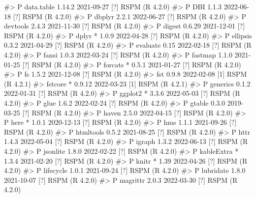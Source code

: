 \documentclass[
  11pt,
  letterpaper,
  DIV=11,
  numbers=noendperiod]{scrartcl}
\newenvironment{Shaded}{}{}
\newcommand{\CommentTok}[1]{\textcolor[rgb]{0.42,0.45,0.49}{#1}}
\begin{document}
\begin{Shaded}
\begin{Highlighting}[]
\CommentTok{\#\textgreater{}  P data.table    1.14.2  2021{-}09{-}27 [?] RSPM (R 4.2.0)}
\CommentTok{\#\textgreater{}  P DBI           1.1.3   2022{-}06{-}18 [?] RSPM (R 4.2.0)}
\CommentTok{\#\textgreater{}  P dbplyr        2.2.1   2022{-}06{-}27 [?] RSPM (R 4.2.0)}
\CommentTok{\#\textgreater{}  P devtools      2.4.3   2021{-}11{-}30 [?] RSPM (R 4.2.0)}
\CommentTok{\#\textgreater{}  P digest        0.6.29  2021{-}12{-}01 [?] RSPM (R 4.2.0)}
\CommentTok{\#\textgreater{}  P dplyr       * 1.0.9   2022{-}04{-}28 [?] RSPM (R 4.2.0)}
\CommentTok{\#\textgreater{}  P ellipsis      0.3.2   2021{-}04{-}29 [?] RSPM (R 4.2.0)}
\CommentTok{\#\textgreater{}  P evaluate      0.15    2022{-}02{-}18 [?] RSPM (R 4.2.0)}
\CommentTok{\#\textgreater{}  P fansi         1.0.3   2022{-}03{-}24 [?] RSPM (R 4.2.0)}
\CommentTok{\#\textgreater{}  P fastmap       1.1.0   2021{-}01{-}25 [?] RSPM (R 4.2.0)}
\CommentTok{\#\textgreater{}  P forcats     * 0.5.1   2021{-}01{-}27 [?] RSPM (R 4.2.0)}
\CommentTok{\#\textgreater{}  P fs            1.5.2   2021{-}12{-}08 [?] RSPM (R 4.2.0)}
\CommentTok{\#\textgreater{}    fst           0.9.8   2022{-}02{-}08 [1] RSPM (R 4.2.1)}
\CommentTok{\#\textgreater{}    fstcore     * 0.9.12  2022{-}03{-}23 [1] RSPM (R 4.2.1)}
\CommentTok{\#\textgreater{}  P generics      0.1.2   2022{-}01{-}31 [?] RSPM (R 4.2.0)}
\CommentTok{\#\textgreater{}  P ggplot2     * 3.3.6   2022{-}05{-}03 [?] RSPM (R 4.2.0)}
\CommentTok{\#\textgreater{}  P glue          1.6.2   2022{-}02{-}24 [?] RSPM (R 4.2.0)}
\CommentTok{\#\textgreater{}  P gtable        0.3.0   2019{-}03{-}25 [?] RSPM (R 4.2.0)}
\CommentTok{\#\textgreater{}  P haven         2.5.0   2022{-}04{-}15 [?] RSPM (R 4.2.0)}
\CommentTok{\#\textgreater{}  P here        * 1.0.1   2020{-}12{-}13 [?] RSPM (R 4.2.0)}
\CommentTok{\#\textgreater{}  P hms           1.1.1   2021{-}09{-}26 [?] RSPM (R 4.2.0)}
\CommentTok{\#\textgreater{}  P htmltools     0.5.2   2021{-}08{-}25 [?] RSPM (R 4.2.0)}
\CommentTok{\#\textgreater{}  P httr          1.4.3   2022{-}05{-}04 [?] RSPM (R 4.2.0)}
\CommentTok{\#\textgreater{}  P igraph        1.3.2   2022{-}06{-}13 [?] RSPM (R 4.2.0)}
\CommentTok{\#\textgreater{}  P jsonlite      1.8.0   2022{-}02{-}22 [?] RSPM (R 4.2.0)}
\CommentTok{\#\textgreater{}  P kableExtra  * 1.3.4   2021{-}02{-}20 [?] RSPM (R 4.2.0)}
\CommentTok{\#\textgreater{}  P knitr       * 1.39    2022{-}04{-}26 [?] RSPM (R 4.2.0)}
\CommentTok{\#\textgreater{}  P lifecycle     1.0.1   2021{-}09{-}24 [?] RSPM (R 4.2.0)}
\CommentTok{\#\textgreater{}  P lubridate     1.8.0   2021{-}10{-}07 [?] RSPM (R 4.2.0)}
\CommentTok{\#\textgreater{}  P magrittr      2.0.3   2022{-}03{-}30 [?] RSPM (R 4.2.0)}

\end{Highlighting}
\end{Shaded}
\end{document}
